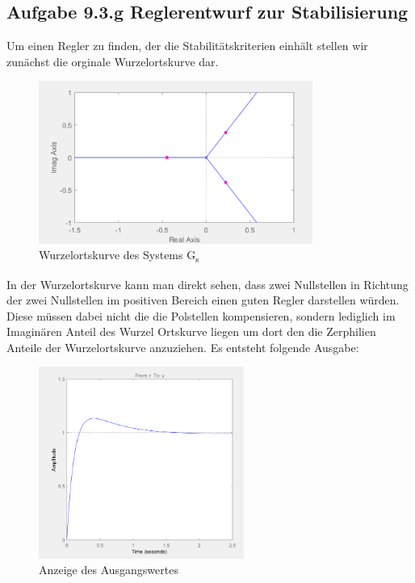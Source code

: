 \documentclass[10pt]{scrartcl}
\begin{document}
\subsection{Aufgabe 9.3.g Reglerentwurf zur Stabilisierung}

Um einen Regler zu finden, der die Stabilitätskriterien einhält stellen wir zunächst die orginale Wurzelortskurve dar.

\begin{figure}[H]
	\centering
	\includegraphics[width=0.8\textwidth]{WOZ9f}
	\caption{Wurzelortskurve des Systems G\textsubscript{s}}
	\label{img:grafik-dummy}
\end{figure}

In der Wurzelortskurve kann man direkt sehen, dass zwei Nullstellen in Richtung der zwei Nullstellen im positiven Bereich einen guten Regler darstellen würden. Diese müssen dabei nicht die die Polstellen kompensieren, sondern lediglich im Imaginären Anteil des Wurzel Ortskurve liegen um dort den die Zerphilien Anteile der Wurzelortskurve anzuziehen.
Es entsteht folgende Ausgabe:

\begin{figure}[H]
	\centering
	\includegraphics[width=0.6\textwidth]{WOZ9f2}
	\caption{Anzeige des Ausgangswertes}
	\label{img:grafik-dummy}
\end{figure}
\end{document}
